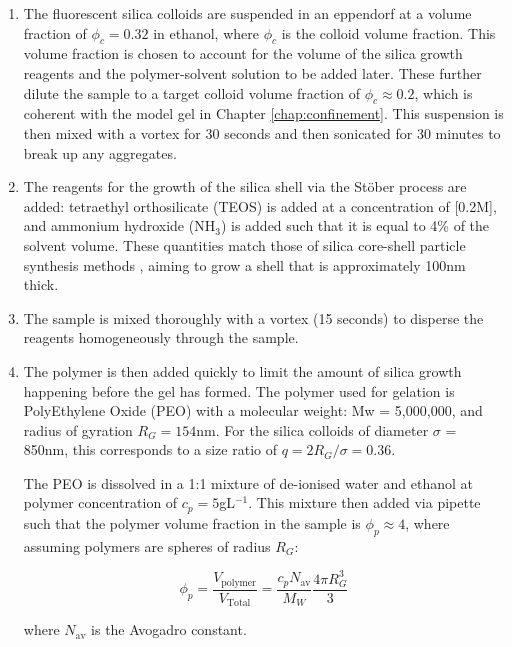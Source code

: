 \begin{enumerate}
	\item The fluorescent silica colloids are suspended in an eppendorf at a volume fraction of $\phi_c = 0.32$ in ethanol, where $\phi_c$ is the colloid volume fraction. This volume fraction is chosen to account for the volume of the silica growth reagents and the polymer-solvent solution to be added later. These further dilute the sample to a target colloid volume fraction  of $\phi_c \approx 0.2$, which is coherent with the model gel in Chapter \ref{chap:confinement}. This suspension is then mixed with a vortex for 30 seconds and then sonicated for 30 minutes to break up any aggregates. 


	\item The reagents for the growth of the silica shell via the Stöber process are added: tetraethyl orthosilicate (TEOS) is added at a concentration of [0.2M], and ammonium hydroxide (NH$_3$)  is added such that it is equal to 4\% of the solvent volume. These quantities match those of silica core-shell particle synthesis methods \cite{chen1996,chou2008,bogush1988}, aiming to grow a shell that is approximately 100nm thick.  
	\item The sample is mixed thoroughly with a vortex (15 seconds) to disperse the reagents homogeneously through the sample.
	\item The polymer is then added quickly to limit the amount of silica growth happening before the gel has formed. The polymer used for gelation is PolyEthylene Oxide (PEO) with a molecular weight: Mw = 5,000,000, and radius of gyration $R_G = 154$nm. For the silica colloids of diameter $\sigma$ = 850nm, this corresponds to a size ratio of $q = 2R_G/\sigma = 0.36$. 
	
		The PEO is dissolved in a 1:1 mixture of de-ionised water and ethanol at polymer concentration of $c_p=5$gL$^{-1}$. This mixture then added  via pipette such that the polymer volume fraction in the sample is $\phi_p \approx 4$, where assuming polymers are spheres of radius $R_G$:
	 
	 \begin{equation}
	 	\phi_{p}=\frac{V_{\mathrm{polymer}}}{V_{\mathrm{Total}}}=\frac{c_p N_{\mathrm{av}}}{M_W} \frac{4 \pi R_{G}^{3}}{3}
	 \end{equation}
	 
	 	where $N_{\mathrm{av}}$ is the Avogadro constant. 


\end{enumerate}
